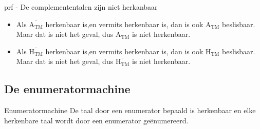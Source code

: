 \begin{prf}{prf - De complemententalen zijn niet herkanbaar}
    \begin{itemize}
        \item 
            Als $\overline{\text{A}_{\text{TM}}}$ herkenbaar is,en vermits herkenbaar is, dan is ook $\text{A}_{\text{TM}}$ beslisbaar. Maar dat is niet het geval, dus $\overline{\text{A}_{\text{TM}}}$ is niet herkenbaar.
        \item 
            Als $\overline{\text{H}_{\text{TM}}}$ herkenbaar is,en vermits herkenbaar is, dan is ook $\text{H}_{\text{TM}}$ beslisbaar. Maar dat is niet het geval, dus $\overline{\text{H}_{\text{TM}}}$ is niet herkenbaar.
    \end{itemize}
\end{prf}

\newpage

\subsection{De enumeratormachine}

\vspace{0.2cm}

\begin{lem}[Enumeratormachine]{Enumeratormachine}
    \vspace{-0.15cm}
    De taal door een enumerator bepaald is herkenbaar en elke herkenbare taal wordt door een enumerator geënumereerd.
    \vspace{-0.1cm}
\end{lem}

